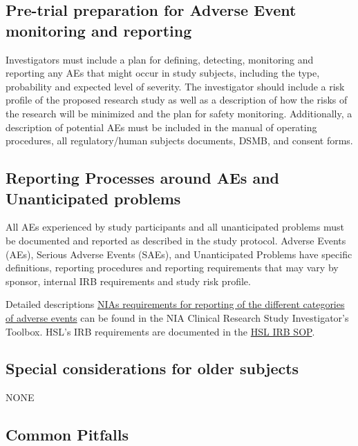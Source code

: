 \documentclass[]{book}
\begin{document}
\subsection{Pre-trial preparation for Adverse Event monitoring and
reporting}\label{pre-trial-preparation-for-adverse-event-monitoring-and-reporting}

Investigators must include a plan for defining, detecting, monitoring
and reporting any AEs that might occur in study subjects, including the
type, probability and expected level of severity. The investigator
should include a risk profile of the proposed research study as well as
a description of how the risks of the research will be minimized and the
plan for safety monitoring. Additionally, a description of potential AEs
must be included in the manual of operating procedures, all
regulatory/human subjects documents, DSMB, and consent forms.

\subsection{Reporting Processes around AEs and Unanticipated
problems}\label{reporting-processes-around-aes-and-unanticipated-problems}

All AEs experienced by study participants and all unanticipated problems
must be documented and reported as described in the study protocol.
Adverse Events (AEs), Serious Adverse Events (SAEs), and Unanticipated
Problems have specific definitions, reporting procedures and reporting
requirements that may vary by sponsor, internal IRB requirements and
study risk profile.

Detailed descriptions
\href{https://www.nia.nih.gov/research/dgcg/clinical-research-study-investigators-toolbox/adverse-events}{NIAs
requirements for reporting of the different categories of adverse
events} can be found in the NIA Clinical Research Study Investigator's
Toolbox. HSL's IRB requirements are documented in the
\href{http://thehslhub/~/media/HSLNet/Docs/IFAR/IRB/IRB_SOP.ashx}{HSL
IRB SOP}.

\subsection{Special considerations for older
subjects}\label{special-considerations-for-older-subjects-6}

NONE

\subsection{Common Pitfalls}\label{common-pitfalls-9}
\end{document}
